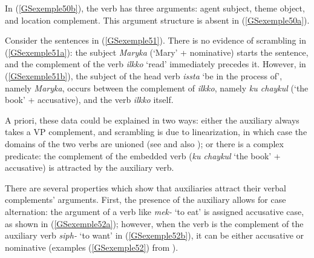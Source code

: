     \label{GSexemple50b}
\zl

In (\ref{GSexemple50b}), the verb has three arguments: agent subject, theme object, and location complement. This argument structure is absent in (\ref{GSexemple50a}).

Consider the sentences in (\ref{GSexemple51}). There is no evidence of scrambling in (\ref{GSexemple51a}): the subject \emph{Maryka} (`Mary' + nominative) starts the sentence, and the complement of the verb \emph{ilkko} `read' immediately precedes it. However, in (\ref{GSexemple51b}), the subject of the head verb \emph{issta} `be in the process of', namely \emph{Maryka}, occurs between the complement of \emph{ilkko}, namely \emph{ku chaykul} (`the book' + accusative), and the verb \emph{ilkko} itself.
\eal
	\label{GSexemple51}
	\label{GSexemple51a}
		
	\label{GSexemple51b}

\zl

A priori, these data could be explained in two ways: either the auxiliary always takes a VP
complement, and scrambling is due to linearization, in which case the domains of the two verbs are
unioned (see \citealt{Reape94a} and also ); or
there is a complex predicate: the complement of the embedded verb (\emph{ku chaykul} `the book' +
accusative) is attracted by the auxiliary verb.

\largerpage[2]
There are several properties which show that auxiliaries attract their verbal complements'
arguments. First, the presence of the auxiliary allows for case alternation: the argument of a verb
like \emph{mek-} `to eat' is assigned accusative case, as shown in (\ref{GSexemple52a}); however,
when the verb is the complement of the auxiliary verb \emph{siph-} `to want' in
(\ref{GSexemple52b}), it can be either accusative or nominative (examples (\ref{GSexemple52}) from
\citealt[87]{Kim2016a-u}).


